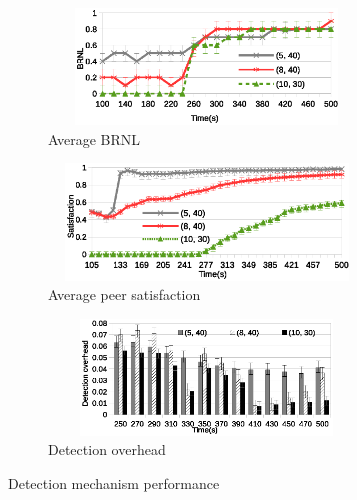 \begin{figure}[tb]
  \centering
  \begin{subfigure}[c]{0.95\columnwidth}
    \centering
    \includegraphics[width=8.4cm,height=3.1cm]{./Figures/det-BRNL1.eps}
    \caption{Average BRNL}%
   \label{subfig:BRNL}
  \end{subfigure}
  \begin{subfigure}[c]{0.95\columnwidth}
    \centering
    \includegraphics[width=8.4cm,height=3.1cm]{./Figures/det-sat.eps}
    \caption{Average peer satisfaction}%
     \label{subfig:det-sat}
  \end{subfigure}
  \begin{subfigure}[c]{0.95\columnwidth}
    \centering
    \includegraphics[width=8.4cm,height=3.1cm]{./Figures/overhead.eps}
    \caption{Detection overhead}%
    \label{subfig:overhead}
  \end{subfigure}
  \caption{Detection mechanism performance}%
 \label{fig:detection-results}
  \vspace{-4mm}
\end{figure}

